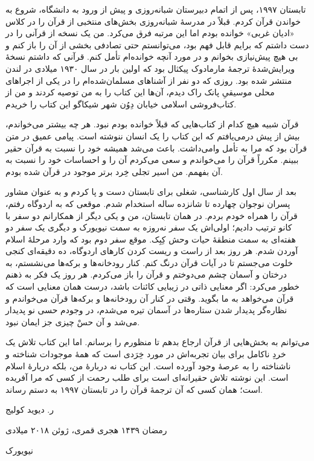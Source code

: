 تابستان ۱۹۹۷، پس از اتمام دبیرستان شبانه‌روزی‌ و پیش از ورود به دانشگاه، شروع به خواندن قرآن کردم. قبلاً در مدرسهٔ شبانه‌روزی بخش‌های منتخبی از قرآن را در کلاس «ادیان غربی» خوانده بودم اما این مرتبه فرق می‌کرد. من یک نسخه از قرآنی را در دست داشتم که برایم قابل فهم بود، می‌توانستم حتی تصادفی بخشی از آن را باز کنم و بی هیچ پیش‌نیازی بخوانم و در مورد آنچه خوانده‌ام تأمل کنم. قرآنی که داشتم نسخهٔ ویرایش‌شدهٔ ترجمهٔ مارمادوک پیکثال
بود که اولین بار در سال ۱۹۳۰ میلادی در لندن منتشر شده بود. روزی که دو نفر از آشناهای مسلمان‌شده‌ام را در یکی از اجراهای محلی موسیقیِ پانک‌ راک
دیدم، آن‌ها این کتاب را به من توصیه کردند و من از کتاب‌فروشی اسلامی خیابان دِوُن 
شهر شیکاگو این کتاب را خریدم.


قرآن شبیه هیچ کدام از کتاب‌هایی که قبلاً خوانده بودم نبود. هر چه بیشتر می‌خواندم، بیش از پیش درمی‌یافتم که این کتاب را یک انسان ننوشته است. پیامی عمیق در متن قرآن بود که مرا به تأمل وامی‌داشت. باعث می‌شد همیشه خود را نسبت به قرآن حقیر ببینم. مکرراً قرآن را می‌خواندم و سعی می‌کردم آن را و  احساسات خود را نسبت به آن بفهمم. من اسیر تجلی  خِرد برتر موجود در قرآن شده بودم. 

بعد از سال اول کارشناسی، شغلی برای تابستان دست و پا کردم و به عنوان مشاور پسران نوجوان چهارده تا شانزده ساله استخدام شدم. موقعی که به اردوگاه رفتم، قرآن را همراه خودم بردم. در همان تابستان، من و یکی دیگر از همکارانم دو سفر با کانو ترتیب دادیم؛‌ اولی‌اش یک سفر نه‌روزه به سمت نیویورک و دیگری یک سفر دو هفته‌ای به سمت منطقهٔ حیات وحش کِبِک. موقع سفر دوم بود که وارد مرحلهٔ اسلام آوردن شدم. هر روز بعد از راست و ریست کردن کارهای اردوگاه، ده دقیقه‌ای کنجی خلوت می‌جستم تا در آیات قرآن درنگ کنم. کنار رودخانه‌ها و برکه‌ها می‌نشستم، به درختان و آسمان چشم می‌دوختم و قرآن را باز می‌کردم. هر روز یک فکر به ذهنم خطور می‌کرد: اگر معنایی ذاتی در زیبایی کائنات باشد، درست همان معنایی است که قرآن می‌خواهد به ما بگوید. وقتی در کنار آن رودخانه‌ها و برکه‌ها قرآن می‌خواندم و نظاره‌گر پدیدار شدن ستاره‌ها در آسمان تیره می‌شدم، در وجودم حسی نو پدیدار می‌شد و آن حسْ چیزی جز ایمان نبود.


می‌توانم به بخش‌هایی از قرآن ارجاع بدهم تا منظورم را برسانم. اما این کتاب تلاش یک خردِ ناکامل برای بیان تجربه‌اش در مورد خِرَدی است که همهٔ موجودات شناخته و ناشناخته را به عرصهٔ‌ وجود آورده است. این کتاب نه دربارهٔ من، بلکه دربارهٔ اسلام است. این نوشته تلاش حقیرانه‌ای است برای طلب رحمت از کسی که مرا آفریده است؛ همان کسی که آن ترجمهٔ‌ قرآن را در تابستان ۱۹۹۷ به دستم رساند. 

\enlargethispage{2\baselineskip}
  \begin{samepage}
\begin{flushleft}
	{
	
	ر. دیوید کولیج
	
	رمضان ۱۴۳۹ هجری قمری،	ژوئن ۲۰۱۸ میلادی
	
	نیویورک
}
\end{flushleft}
\end{samepage}






